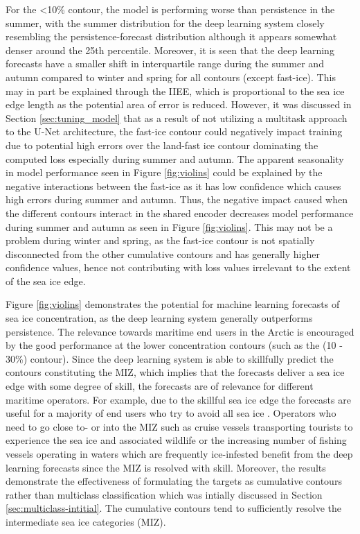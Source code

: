 \documentclass[../main/thesis]{subfiles}
\begin{document}
For the <10\% contour, the model is performing worse than persistence in the summer, with the summer distribution for the deep learning system closely resembling the persistence-forecast distribution although it appears somewhat denser around the 25th percentile. Moreover, it is seen that the deep learning forecasts have a smaller shift in interquartile range during the summer and autumn compared to winter and spring for all contours (except fast-ice). This may in part be explained through the IIEE, which is proportional to the sea ice edge length \cite{Goessling2016} as the potential area of error is reduced. However, it was discussed in Section \ref{sec:tuning_model} that as a result of not utilizing a multitask approach to the U-Net architecture, the fast-ice contour could negatively impact training due to potential high errors over the land-fast ice contour dominating the computed loss especially during summer and autumn. The apparent seasonality in model performance seen in Figure \ref{fig:violins} could be explained by the negative interactions between the fast-ice as it has low confidence which causes high errors during summer and autumn. Thus, the negative impact caused when the different contours interact in the shared encoder decreases model performance during summer and autumn as seen in Figure \ref{fig:violins}. This may not be a problem during winter and spring, as the fast-ice contour is not spatially disconnected from the other cumulative contours and has generally higher confidence values, hence not contributing with loss values irrelevant to the extent of the sea ice edge.

Figure \ref{fig:violins} demonstrates the potential for machine learning forecasts of sea ice concentration, as the deep learning system generally outperforms persistence. The relevance towards maritime end users in the Arctic is encouraged by the good performance at the lower concentration contours (such as the (10 - 30\%) contour). Since the deep learning system is able to skillfully predict the contours constituting the MIZ, which implies that the forecasts deliver a sea ice edge with some degree of skill, the forecasts are of relevance for different maritime operators. For example, due to the skillful sea ice edge the forecasts are useful for a majority of end users who try to avoid all sea ice \citep{Wagner2020, Veland2021}. Operators who need to go close to- or into the MIZ such as cruise vessels transporting tourists to experience the sea ice and associated wildlife \citep{Palma2019} or the increasing number of fishing vessels operating in waters which are frequently ice-infested \citep{Stocker2020} benefit from the deep learning forecasts since the MIZ is resolved with skill. Moreover, the results demonstrate the effectiveness of formulating the targets as cumulative contours rather than multiclass classification which was intially discussed in Section \ref{sec:multiclass-intitial}. The cumulative contours tend to sufficiently resolve the intermediate sea ice categories (MIZ).
\end{document}

